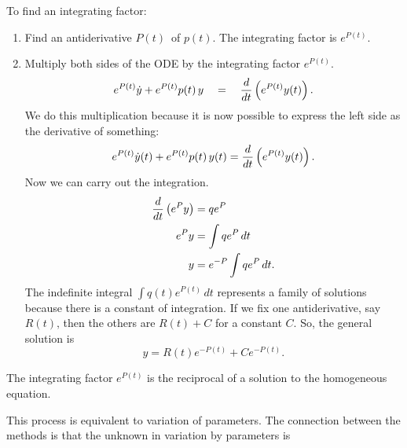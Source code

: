 To find an {\color{blue} integrating factor:}
\begin{enumerate}
\item Find an antiderivative $P(t)\,$ of $p(t)$. The integrating factor is $e^{P(t)}$.
\item Multiply both sides of the ODE by the integrating factor $e^{P(t)}$.
  \begin{equation*}
    \displaystyle \displaystyle  e^{P(t)} \dot{y} + e^{P(t)} p(t) \,  y
    \quad = \quad
    \displaystyle  \frac{d}{dt} \left( e^{P(t)} y(t) \right) .
  \end{equation*}
  We do this multiplication because it is now possible to express
  the left side as the derivative of something:
  \begin{equation*}
    \displaystyle \displaystyle  e^{P(t)} \dot{y}(t) + e^{P(t)} p(t) \,  y(t)
    \displaystyle =
    \displaystyle  \frac{d}{dt} \left( e^{P(t)} y(t) \right) .
  \end{equation*}
  Now we can carry out the integration.
  \begin{align*}
    \displaystyle  \frac{d}{dt} \left( e^{P} y \right)
    \displaystyle &= \displaystyle \displaystyle  q e^{P} \\
    \displaystyle e^{P} y \displaystyle
                  &= \displaystyle
                    \displaystyle  \int q e^{P} \,  dt \\
    \displaystyle y
    \displaystyle &= \displaystyle  e^{-P} \int q e^{P} \,  dt.
  \end{align*}
  The indefinite integral $\displaystyle \int q(t) e^{P(t)} \,  dt$
  represents a family of solutions because there is a constant of integration.
  If we fix one antiderivative, say$R(t) , \,$then the others are $R(t) + C$
  for a constant $C$. So, the general solution is
  \begin{equation*}
    y = R(t) e^{-P(t)} + C e^{-P(t)}.
  \end{equation*}
\end{enumerate}

\begin{remark}
  The integrating factor $e^{P(t)}$ is the reciprocal of a solution
  to the homogeneous equation.
\end{remark}

\begin{remark}
  This process is equivalent to variation of parameters.
  The connection between the methods is that the unknown in variation by parameters is
\end{remark}

